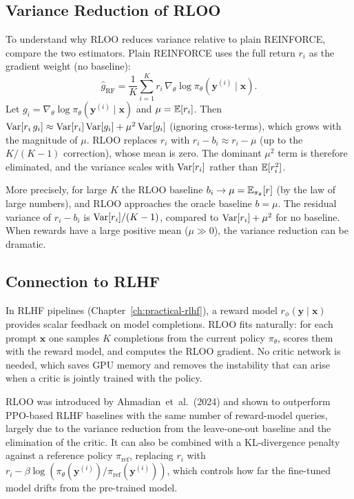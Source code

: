 \subsection{Variance Reduction of RLOO}


To understand why RLOO reduces variance relative to plain REINFORCE, compare the two estimators.  Plain REINFORCE uses the full return $r_i$ as the gradient weight (no baseline):
\[
\hat g_{\text{RF}} = \frac{1}{K}\sum_{i=1}^K r_i\, \nabla_\theta \log \pi_\theta(\mathbf{y}^{(i)} \mid \mathbf{x}).
\]
Let $g_i = \nabla_\theta \log \pi_\theta(\mathbf{y}^{(i)} \mid \mathbf{x})$ and $\mu = \operatorname{\mathbb{E}}[r_i]$.  Then $\operatorname{Var}[r_i\, g_i] \approx \operatorname{Var}[r_i] \operatorname{Var}[g_i] + \mu^2 \operatorname{Var}[g_i]$ (ignoring cross-terms), which grows with the magnitude of $\mu$.  RLOO replaces $r_i$ with $r_i - b_i \approx r_i - \mu$ (up to the $K/(K-1)$ correction), whose mean is zero.  The dominant $\mu^2$ term is therefore eliminated, and the variance scales with $\operatorname{Var}[r_i]$ rather than $\operatorname{\mathbb{E}}[r_i^2]$.

More precisely, for large $K$ the RLOO baseline $b_i \to \mu = \operatorname{\mathbb{E}}_{\pi_\theta}[r]$ (by the law of large numbers), and RLOO approaches the oracle baseline $b = \mu$.  The residual variance of $r_i - b_i$ is $\operatorname{Var}[r_i] / (K-1)$, compared to $\operatorname{Var}[r_i] + \mu^2$ for no baseline.  When rewards have a large positive mean ($\mu \gg 0$), the variance reduction can be dramatic.

\subsection{Connection to RLHF}


In RLHF pipelines (Chapter~\ref{ch:practical-rlhf}), a reward model $r_\phi(\mathbf{y} \mid \mathbf{x})$ provides scalar feedback on model completions.  RLOO fits naturally: for each prompt $\mathbf{x}$ one samples $K$ completions from the current policy $\pi_\theta$, scores them with the reward model, and computes the RLOO gradient.  No critic network is needed, which saves GPU memory and removes the instability that can arise when a critic is jointly trained with the policy.

RLOO was introduced by Ahmadian~et~al.\ (2024) and shown to outperform PPO-based RLHF baselines with the same number of reward-model queries, largely due to the variance reduction from the leave-one-out baseline and the elimination of the critic.  It can also be combined with a KL-divergence penalty against a reference policy $\pi_{\text{ref}}$, replacing $r_i$ with $r_i - \beta \log(\pi_\theta(\mathbf{y}^{(i)}) / \pi_{\text{ref}}(\mathbf{y}^{(i)}))$, which controls how far the fine-tuned model drifts from the pre-trained model.

